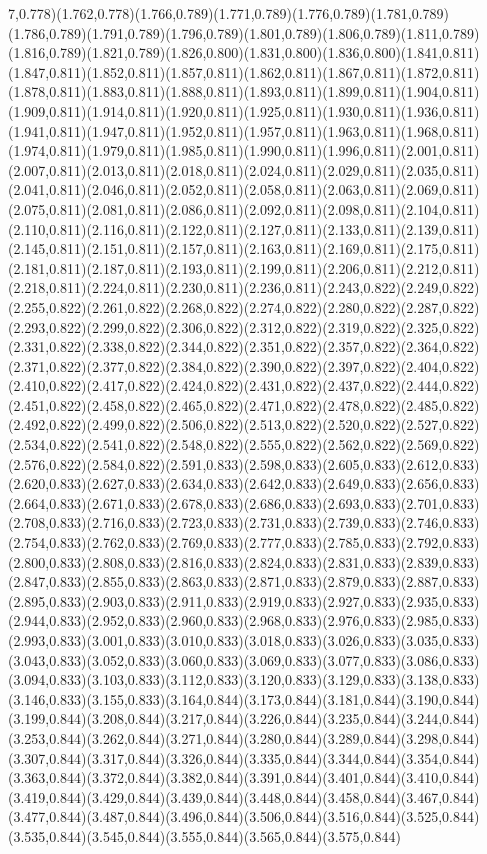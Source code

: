 \documentclass[smallextended]{svjour3}
\begin{document}
7,0.778)(1.762,0.778)(1.766,0.789)(1.771,0.789)(1.776,0.789)(1.781,0.789)(1.786,0.789)(1.791,0.789)(1.796,0.789)(1.801,0.789)(1.806,0.789)(1.811,0.789)(1.816,0.789)(1.821,0.789)(1.826,0.800)(1.831,0.800)(1.836,0.800)(1.841,0.811)(1.847,0.811)(1.852,0.811)(1.857,0.811)(1.862,0.811)(1.867,0.811)(1.872,0.811)(1.878,0.811)(1.883,0.811)(1.888,0.811)(1.893,0.811)(1.899,0.811)(1.904,0.811)(1.909,0.811)(1.914,0.811)(1.920,0.811)(1.925,0.811)(1.930,0.811)(1.936,0.811)(1.941,0.811)(1.947,0.811)(1.952,0.811)(1.957,0.811)(1.963,0.811)(1.968,0.811)(1.974,0.811)(1.979,0.811)(1.985,0.811)(1.990,0.811)(1.996,0.811)(2.001,0.811)(2.007,0.811)(2.013,0.811)(2.018,0.811)(2.024,0.811)(2.029,0.811)(2.035,0.811)(2.041,0.811)(2.046,0.811)(2.052,0.811)(2.058,0.811)(2.063,0.811)(2.069,0.811)(2.075,0.811)(2.081,0.811)(2.086,0.811)(2.092,0.811)(2.098,0.811)(2.104,0.811)(2.110,0.811)(2.116,0.811)(2.122,0.811)(2.127,0.811)(2.133,0.811)(2.139,0.811)(2.145,0.811)(2.151,0.811)(2.157,0.811)(2.163,0.811)(2.169,0.811)(2.175,0.811)(2.181,0.811)(2.187,0.811)(2.193,0.811)(2.199,0.811)(2.206,0.811)(2.212,0.811)(2.218,0.811)(2.224,0.811)(2.230,0.811)(2.236,0.811)(2.243,0.822)(2.249,0.822)(2.255,0.822)(2.261,0.822)(2.268,0.822)(2.274,0.822)(2.280,0.822)(2.287,0.822)(2.293,0.822)(2.299,0.822)(2.306,0.822)(2.312,0.822)(2.319,0.822)(2.325,0.822)(2.331,0.822)(2.338,0.822)(2.344,0.822)(2.351,0.822)(2.357,0.822)(2.364,0.822)(2.371,0.822)(2.377,0.822)(2.384,0.822)(2.390,0.822)(2.397,0.822)(2.404,0.822)(2.410,0.822)(2.417,0.822)(2.424,0.822)(2.431,0.822)(2.437,0.822)(2.444,0.822)(2.451,0.822)(2.458,0.822)(2.465,0.822)(2.471,0.822)(2.478,0.822)(2.485,0.822)(2.492,0.822)(2.499,0.822)(2.506,0.822)(2.513,0.822)(2.520,0.822)(2.527,0.822)(2.534,0.822)(2.541,0.822)(2.548,0.822)(2.555,0.822)(2.562,0.822)(2.569,0.822)(2.576,0.822)(2.584,0.822)(2.591,0.833)(2.598,0.833)(2.605,0.833)(2.612,0.833)(2.620,0.833)(2.627,0.833)(2.634,0.833)(2.642,0.833)(2.649,0.833)(2.656,0.833)(2.664,0.833)(2.671,0.833)(2.678,0.833)(2.686,0.833)(2.693,0.833)(2.701,0.833)(2.708,0.833)(2.716,0.833)(2.723,0.833)(2.731,0.833)(2.739,0.833)(2.746,0.833)(2.754,0.833)(2.762,0.833)(2.769,0.833)(2.777,0.833)(2.785,0.833)(2.792,0.833)(2.800,0.833)(2.808,0.833)(2.816,0.833)(2.824,0.833)(2.831,0.833)(2.839,0.833)(2.847,0.833)(2.855,0.833)(2.863,0.833)(2.871,0.833)(2.879,0.833)(2.887,0.833)(2.895,0.833)(2.903,0.833)(2.911,0.833)(2.919,0.833)(2.927,0.833)(2.935,0.833)(2.944,0.833)(2.952,0.833)(2.960,0.833)(2.968,0.833)(2.976,0.833)(2.985,0.833)(2.993,0.833)(3.001,0.833)(3.010,0.833)(3.018,0.833)(3.026,0.833)(3.035,0.833)(3.043,0.833)(3.052,0.833)(3.060,0.833)(3.069,0.833)(3.077,0.833)(3.086,0.833)(3.094,0.833)(3.103,0.833)(3.112,0.833)(3.120,0.833)(3.129,0.833)(3.138,0.833)(3.146,0.833)(3.155,0.833)(3.164,0.844)(3.173,0.844)(3.181,0.844)(3.190,0.844)(3.199,0.844)(3.208,0.844)(3.217,0.844)(3.226,0.844)(3.235,0.844)(3.244,0.844)(3.253,0.844)(3.262,0.844)(3.271,0.844)(3.280,0.844)(3.289,0.844)(3.298,0.844)(3.307,0.844)(3.317,0.844)(3.326,0.844)(3.335,0.844)(3.344,0.844)(3.354,0.844)(3.363,0.844)(3.372,0.844)(3.382,0.844)(3.391,0.844)(3.401,0.844)(3.410,0.844)(3.419,0.844)(3.429,0.844)(3.439,0.844)(3.448,0.844)(3.458,0.844)(3.467,0.844)(3.477,0.844)(3.487,0.844)(3.496,0.844)(3.506,0.844)(3.516,0.844)(3.525,0.844)(3.535,0.844)(3.545,0.844)(3.555,0.844)(3.565,0.844)(3.575,0.844)
\end{document}
